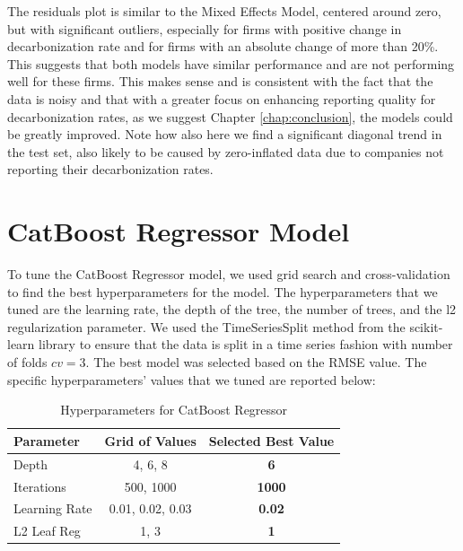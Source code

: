 The residuals plot is similar to the Mixed Effects Model, centered around zero, but with significant outliers, especially for firms with positive change in decarbonization rate and for firms with an absolute change of more than 20\%. This suggests that both models have similar performance and are not performing well for these firms. This makes sense and is consistent with the fact that the data is noisy and that with a greater focus on enhancing reporting quality for decarbonization rates, as we suggest Chapter \ref{chap:conclusion}, the models could be greatly improved. Note how also here we find a significant diagonal trend in the test set, also likely to be caused by zero-inflated data due to companies not reporting their decarbonization rates.

\section{CatBoost Regressor Model}
To tune the CatBoost Regressor model, we used grid search and cross-validation to find the best hyperparameters for the model. The hyperparameters that we tuned are the learning rate, the depth of the tree, the number of trees, and the l2 regularization parameter. We used the TimeSeriesSplit method from the scikit-learn library to ensure that the data is split in a time series fashion with number of folds $cv = 3$. The best model was selected based on the RMSE value. The specific hyperparameters' values that we tuned are reported below:

\begin{table}[H]
    \centering
    \caption{Hyperparameters for CatBoost Regressor}
    \label{tab:hyperparameters}
    \begin{tabular}{@{}lcc@{}}
    \toprule
    Parameter       & Grid of Values        & Selected Best Value \\ 
    \midrule
    Depth           & 4, 6, 8               & \textbf{6}                   \\
    Iterations      & 500, 1000             & \textbf{1000}                \\
    Learning Rate   & 0.01, 0.02, 0.03      & \textbf{0.02}                \\
    L2 Leaf Reg     & 1, 3                  & \textbf{1}                   \\ 
    \bottomrule
    \end{tabular}
\end{table}



